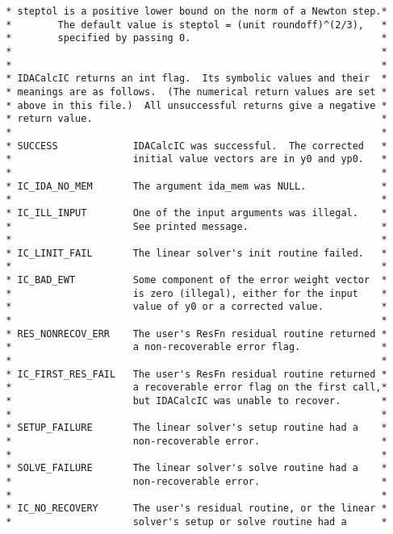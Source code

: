 \documentclass[11pt]{article}
\begin{document}
\begin{verbatim}
 * steptol is a positive lower bound on the norm of a Newton step.*
 *        The default value is steptol = (unit roundoff)^(2/3),   *
 *        specified by passing 0.                                 *
 *                                                                *
 *                                                                *
 * IDACalcIC returns an int flag.  Its symbolic values and their  *
 * meanings are as follows.  (The numerical return values are set *
 * above in this file.)  All unsuccessful returns give a negative *
 * return value.                                                  *
 *                                                                *
 * SUCCESS             IDACalcIC was successful.  The corrected   *
 *                     initial value vectors are in y0 and yp0.   * 
 *                                                                *
 * IC_IDA_NO_MEM       The argument ida_mem was NULL.             *
 *                                                                *
 * IC_ILL_INPUT        One of the input arguments was illegal.    *
 *                     See printed message.                       *
 *                                                                *
 * IC_LINIT_FAIL       The linear solver's init routine failed.   *
 *                                                                *
 * IC_BAD_EWT          Some component of the error weight vector  *
 *                     is zero (illegal), either for the input    *
 *                     value of y0 or a corrected value.          *
 *                                                                *
 * RES_NONRECOV_ERR    The user's ResFn residual routine returned *
 *                     a non-recoverable error flag.              *
 *                                                                *
 * IC_FIRST_RES_FAIL   The user's ResFn residual routine returned *
 *                     a recoverable error flag on the first call,*
 *                     but IDACalcIC was unable to recover.       *
 *                                                                *
 * SETUP_FAILURE       The linear solver's setup routine had a    *
 *                     non-recoverable error.                     *
 *                                                                *
 * SOLVE_FAILURE       The linear solver's solve routine had a    *
 *                     non-recoverable error.                     *
 *                                                                *
 * IC_NO_RECOVERY      The user's residual routine, or the linear *
 *                     solver's setup or solve routine had a      *

\end{verbatim}
\end{document}
